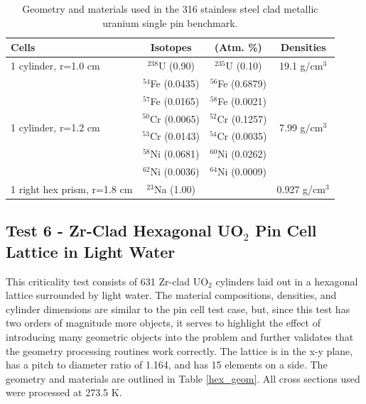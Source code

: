 \documentclass[preprint,12pt]{elsarticle}
\begin{document}
\begin{table}[h]
\centering
\caption{Geometry and materials used in the 316 stainless steel clad metallic uranium single pin benchmark.}
\label{sodium_geom}
\begin{tabular}{| l | c  c  | c |}
\hline
Cells & Isotopes & (Atm. \%)     & Densities \\
\hline
\multirow{1}{*}{1 cylinder, r=1.0 cm }   &  $^{238}$U   (0.90)   & $^{235}$U   (0.10)   &    \multirow{1}{*}{19.1 g/cm$^3$} \\
\hline
\multirow{6}{*}{1 cylinder, r=1.2 cm }   &  $^{54}$Fe  (0.0435) & $^{56}$Fe  (0.6879)  &   \multirow{6}{*}{7.99 g/cm$^3$} \\
                                         &  $^{57}$Fe  (0.0165) & $^{58}$Fe  (0.0021)  &   \\
                                         &  $^{50}$Cr  (0.0065) & $^{52}$Cr  (0.1257)  &   \\
                                         &  $^{53}$Cr  (0.0143) & $^{54}$Cr  (0.0035)  &   \\
                                         &  $^{58}$Ni  (0.0681) & $^{60}$Ni  (0.0262)  &   \\
                                         &  $^{62}$Ni  (0.0036) &  $^{64}$Ni  (0.0009) &   \\
\hline
1 right hex prism, r=1.8 cm              &  $^{23}$Na   (1.00)  &                      &    0.927 g/cm$^3$ \\
\hline
\end{tabular}
\end{table}


\newpage
\subsection{Test 6 - Zr-Clad Hexagonal UO$_2$ Pin Cell Lattice in Light Water}

This criticality test consists of 631 Zr-clad UO$_2$ cylinders laid out in a hexagonal lattice surrounded by light water.  The material compositions, densities, and cylinder dimensions are similar to the pin cell test case, but, since this test has two orders of magnitude more objects, it serves to highlight the effect of introducing many geometric objects into the problem and further validates that the geometry processing routines work correctly.  The lattice is in the x-y plane, has a pitch to diameter ratio of 1.164, and has 15 elements on a side.  The geometry and materials are outlined in Table \ref{hex_geom}.  All cross sections used were processed at 273.5 K.
\end{document}
